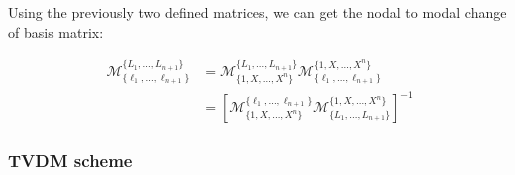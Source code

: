 \documentclass[10pt]{article}
\begin{document}
Using the previously two defined matrices, we can get the nodal to modal change of basis matrix:

\begin{align*}
  \mathcal{M}_{\{\ell_1,\ldots,\ell_{n+1}\}}^{\{L_1,\ldots, L_{n+1}\}} &= \mathcal{M}_{\{1,X,\ldots, X^n\}}^{\{L_1,\ldots, L_{n+1}\}}\mathcal{M}_{\{\ell_1,\ldots,\ell_{n+1}\}}^{\{1, X,\ldots, X^n\}} \\
                                                                       &= \left[\mathcal{M}_{\{1,X,\ldots, X^n\}}^{\{\ell_1,\ldots, \ell_{n+1}\}}\mathcal{M}_{\{L_1,\ldots,L_{n+1}\}}^{\{1, X,\ldots, X^n\}}\right]^{-1}
\end{align*}

\subsubsection{TVDM scheme}

\printbibliography
\end{document}
